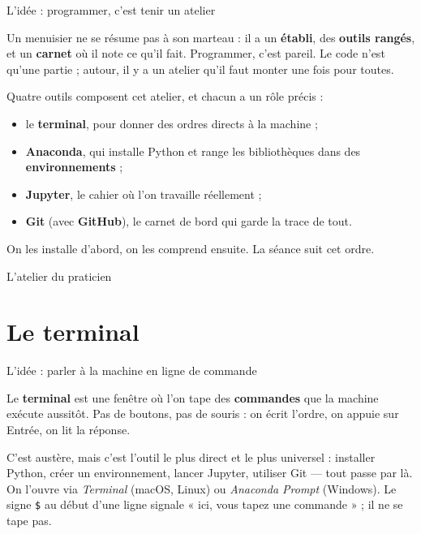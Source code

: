 \documentclass[aspectratio=169,11pt]{beamer}
\begin{document}
\begin{frame}{L'idée : programmer, c'est tenir un atelier}
\begin{ucadfront}[Analogie]
{\small Un menuisier ne se résume pas à son marteau : il a un \textbf{établi}, des \textbf{outils rangés}, et un \textbf{carnet} où il note ce qu'il fait. Programmer, c'est pareil. Le code n'est qu'une partie ; autour, il y a un atelier qu'il faut monter une fois pour toutes.}
\end{ucadfront}
{\small Quatre outils composent cet atelier, et chacun a un rôle précis :}
\begin{itemize}\small
  \item le \textbf{terminal}, pour donner des ordres directs à la machine ;
  \item \textbf{Anaconda}, qui installe Python et range les bibliothèques dans des \textbf{environnements} ;
  \item \textbf{Jupyter}, le cahier où l'on travaille réellement ;
  \item \textbf{Git} (avec \textbf{GitHub}), le carnet de bord qui garde la trace de tout.
\end{itemize}
{\small On les installe d'abord, on les comprend ensuite. La séance suit cet ordre.}
\end{frame}

\begin{frame}{L'atelier du praticien}
\end{frame}

\section{Le terminal}

\begin{frame}{L'idée : parler à la machine en ligne de commande}
\begin{ucaddef}
{\small Le \textbf{terminal} est une fenêtre où l'on tape des \textbf{commandes} que la machine exécute aussitôt. Pas de boutons, pas de souris : on écrit l'ordre, on appuie sur Entrée, on lit la réponse.}
\end{ucaddef}
{\small C'est austère, mais c'est l'outil le plus direct et le plus universel : installer Python, créer un environnement, lancer Jupyter, utiliser Git — tout passe par là. On l'ouvre via \emph{Terminal} (macOS, Linux) ou \emph{Anaconda Prompt} (Windows). Le signe \texttt{\$} au début d'une ligne signale « ici, vous tapez une commande » ; il ne se tape pas.}
\end{frame}
\end{document}
